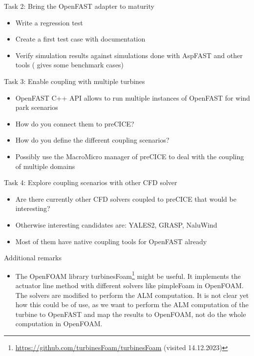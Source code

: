 Task 2: Bring the OpenFAST adapter to maturity
\begin{itemize}
	\item Write a regression test
	\item Create a first test case with documentation
	\item Verify simulation results against simulations done with AspFAST and other tools (\cite{Taschner:2022} gives some benchmark cases)\\
\end{itemize}

Task 3: Enable coupling with multiple turbines
\begin{itemize}
	\item OpenFAST C++ API allows to run multiple instances of OpenFAST for wind park scenarios
	\item How do you connect them to preCICE? 
	\item How do you define the different coupling scenarios?
	\item Possibly use the MacroMicro manager of preCICE to deal with the coupling of multiple domains\\
\end{itemize}

Task 4: Explore coupling scenarios with other CFD solver
\begin{itemize}
	\item Are there currently other CFD solvers coupled to preCICE that would be interesting?
	\item Otherwise interesting candidates are: YALES2, GRASP, NaluWind
	\item Most of them have native coupling tools for OpenFAST already\\
\end{itemize}

Additional remarks
\begin{itemize}
	\item The OpenFOAM library turbinesFoam\footnote{\url{https://github.com/turbinesFoam/turbinesFoam} (visited 14.12.2023)} \cite{Bachant:2018} might be useful. It implements the actuator line method with different solvers like pimpleFoam in OpenFOAM. The solvers are modified to perform the ALM computation. It is not clear yet how this could be of use, as we want to perform the ALM computation of the turbine to OpenFAST and map the results to OpenFOAM, not do the whole computation in OpenFOAM.
\end{itemize}
